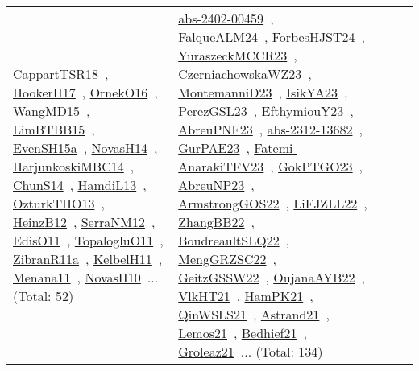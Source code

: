 {\begin{longtable}{lp{3cm}>{\raggedright\arraybackslash}p{6cm}>{\raggedright\arraybackslash}p{6cm}>{\raggedright\arraybackslash}p{8cm}}
\href{../works/CappartTSR18.pdf}{CappartTSR18}~\cite{CappartTSR18}, \href{../works/HookerH17.pdf}{HookerH17}~\cite{HookerH17}, \href{../works/OrnekO16.pdf}{OrnekO16}~\cite{OrnekO16}, \href{../works/WangMD15.pdf}{WangMD15}~\cite{WangMD15}, \href{../works/LimBTBB15.pdf}{LimBTBB15}~\cite{LimBTBB15}, \href{../works/EvenSH15a.pdf}{EvenSH15a}~\cite{EvenSH15a}, \href{../works/NovasH14.pdf}{NovasH14}~\cite{NovasH14}, \href{../works/HarjunkoskiMBC14.pdf}{HarjunkoskiMBC14}~\cite{HarjunkoskiMBC14}, \href{../works/ChunS14.pdf}{ChunS14}~\cite{ChunS14}, \href{../works/HamdiL13.pdf}{HamdiL13}~\cite{HamdiL13}, \href{../works/OzturkTHO13.pdf}{OzturkTHO13}~\cite{OzturkTHO13}, \href{../works/HeinzB12.pdf}{HeinzB12}~\cite{HeinzB12}, \href{../works/SerraNM12.pdf}{SerraNM12}~\cite{SerraNM12}, \href{../works/EdisO11.pdf}{EdisO11}~\cite{EdisO11}, \href{../works/TopalogluO11.pdf}{TopalogluO11}~\cite{TopalogluO11}, \href{../works/ZibranR11a.pdf}{ZibranR11a}~\cite{ZibranR11a}, \href{../works/KelbelH11.pdf}{KelbelH11}~\cite{KelbelH11}, \href{../works/Menana11.pdf}{Menana11}~\cite{Menana11}, \href{../works/NovasH10.pdf}{NovasH10}~\cite{NovasH10}... (Total: 52) & \href{../works/abs-2402-00459.pdf}{abs-2402-00459}~\cite{abs-2402-00459}, \href{../works/FalqueALM24.pdf}{FalqueALM24}~\cite{FalqueALM24}, \href{../works/ForbesHJST24.pdf}{ForbesHJST24}~\cite{ForbesHJST24}, \href{../works/YuraszeckMCCR23.pdf}{YuraszeckMCCR23}~\cite{YuraszeckMCCR23}, \href{../works/CzerniachowskaWZ23.pdf}{CzerniachowskaWZ23}~\cite{CzerniachowskaWZ23}, \href{../works/MontemanniD23.pdf}{MontemanniD23}~\cite{MontemanniD23}, \href{../works/IsikYA23.pdf}{IsikYA23}~\cite{IsikYA23}, \href{../works/PerezGSL23.pdf}{PerezGSL23}~\cite{PerezGSL23}, \href{../works/EfthymiouY23.pdf}{EfthymiouY23}~\cite{EfthymiouY23}, \href{../works/AbreuPNF23.pdf}{AbreuPNF23}~\cite{AbreuPNF23}, \href{../works/abs-2312-13682.pdf}{abs-2312-13682}~\cite{abs-2312-13682}, \href{../works/GurPAE23.pdf}{GurPAE23}~\cite{GurPAE23}, \href{../works/Fatemi-AnarakiTFV23.pdf}{Fatemi-AnarakiTFV23}~\cite{Fatemi-AnarakiTFV23}, \href{../works/GokPTGO23.pdf}{GokPTGO23}~\cite{GokPTGO23}, \href{../works/AbreuNP23.pdf}{AbreuNP23}~\cite{AbreuNP23}, \href{../works/ArmstrongGOS22.pdf}{ArmstrongGOS22}~\cite{ArmstrongGOS22}, \href{../works/LiFJZLL22.pdf}{LiFJZLL22}~\cite{LiFJZLL22}, \href{../works/ZhangBB22.pdf}{ZhangBB22}~\cite{ZhangBB22}, \href{../works/BoudreaultSLQ22.pdf}{BoudreaultSLQ22}~\cite{BoudreaultSLQ22}, \href{../works/MengGRZSC22.pdf}{MengGRZSC22}~\cite{MengGRZSC22}, \href{../works/GeitzGSSW22.pdf}{GeitzGSSW22}~\cite{GeitzGSSW22}, \href{../works/OujanaAYB22.pdf}{OujanaAYB22}~\cite{OujanaAYB22}, \href{../works/VlkHT21.pdf}{VlkHT21}~\cite{VlkHT21}, \href{../works/HamPK21.pdf}{HamPK21}~\cite{HamPK21}, \href{../works/QinWSLS21.pdf}{QinWSLS21}~\cite{QinWSLS21}, \href{../works/Astrand21.pdf}{Astrand21}~\cite{Astrand21}, \href{../works/Lemos21.pdf}{Lemos21}~\cite{Lemos21}, \href{../works/Bedhief21.pdf}{Bedhief21}~\cite{Bedhief21}, \href{../works/Groleaz21.pdf}{Groleaz21}~\cite{Groleaz21}... (Total: 134)\\

\end{longtable}}
